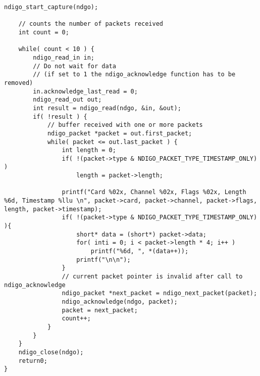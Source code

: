 \begin{lstlisting}[frame=tlrb]
	ndigo_start_capture(ndgo);
	
	// counts the number of packets received
	int count = 0;
	
	while( count < 10 ) {
		ndigo_read_in in;
		// Do not wait for data
		// (if set to 1 the ndigo_acknowledge function has to be removed)
		in.acknowledge_last_read = 0;
		ndigo_read_out out;
		int result = ndigo_read(ndgo, &in, &out);
		if( !result ) {
			// buffer received with one or more packets
			ndigo_packet *packet = out.first_packet;
			while( packet <= out.last_packet ) {
				int length = 0;
				if( !(packet->type & NDIGO_PACKET_TYPE_TIMESTAMP_ONLY) )
					length = packet->length;
					
				printf("Card %02x, Channel %02x, Flags %02x, Length %6d, Timestamp %llu \n", packet->card, packet->channel, packet->flags, length, packet->timestamp);
				if( !(packet->type & NDIGO_PACKET_TYPE_TIMESTAMP_ONLY) ){
					short* data = (short*) packet->data;
					for( inti = 0; i < packet->length * 4; i++ )
						printf("%6d, ", *(data++));
					printf("\n\n");
				}
				// current packet pointer is invalid after call to ndigo_acknowledge
				ndigo_packet *next_packet = ndigo_next_packet(packet);
				ndigo_acknowledge(ndgo, packet);
				packet = next_packet;
				count++;
			}
		}
	}
	ndigo_close(ndgo);
	return0;
}

\end{lstlisting}
